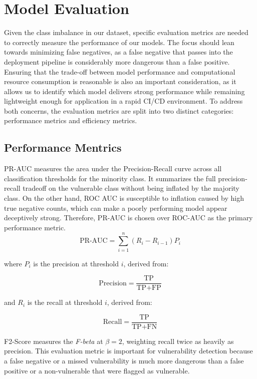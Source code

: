 \section{Model Evaluation}
Given the class imbalance in our dataset, specific evaluation metrics are needed to correctly measure the performance of our models. The focus should lean towards minimizing false negatives, as a false negative that passes into the deployment pipeline is considerably more dangerous than a false positive. Ensuring that the trade-off between model performance and computational resource consumption is reasonable is also an important consideration, as it allows us to identify which model delivers strong performance while remaining lightweight enough for application in a rapid CI/CD environment. To address both concerns, the evaluation metrics are split into two distinct categories: performance metrics and efficiency metrics.

\subsection{Performance Mentrics}
PR-AUC measures the area under the Precision-Recall curve across all classification thresholds for the minority class. It summarizes the full precision-recall tradeoff on the vulnerable class without being inflated by the majority class. On the other hand, ROC AUC is susceptible to inflation caused by high true negative counts, which can make a poorly performing model appear deceptively strong. Therefore, PR-AUC is chosen over ROC-AUC as the primary performance metric.
\begin{equation}
  \text{PR-AUC} = \sum_{i=1}^{n} (R_i - R_{i-1}) P_i
  \label{eq:pr-auc}
\end{equation}

where \(P_i\) is the precision at threshold \(i\), derived from:

\begin{equation}
  \text{Precision} = \frac{\text{TP}}{\text{TP} + \text{FP}}
  \label{eq:precision}
\end{equation}

and \(R_i\) is the recall at threshold \(i\), derived from:

\begin{equation}
  \text{Recall} = \frac{\text{TP}}{\text{TP} + \text{FN}}
  \label{eq:recall}
\end{equation}

F2-Score measures the \emph{F-beta} at \(\beta = 2\), weighting recall twice as heavily as precision. This evaluation metric is important for vulnerability detection because a false negative or a missed vulnerability is much more dangerous than a false positive or a non-vulnerable that were flagged as vulnerable.

